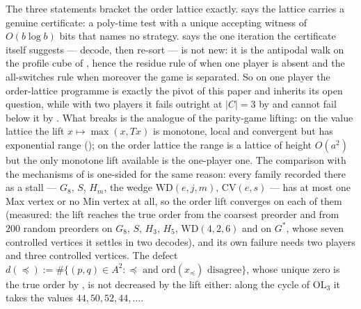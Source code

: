 \begin{remark}\label{ol:rem-where}
The three statements bracket the order lattice exactly.
 says the lattice carries a genuine certificate: a
poly-time test with a unique accepting witness of $O(b\log b)$ bits that
names no strategy.  says the one iteration the
certificate itself suggests --- decode, then re-sort --- is not new: it is
the antipodal walk on the profile cube of ,
hence the residue rule of  when one player is absent
and the all-switches rule when moreover the game is separated. So on one
player the order-lattice programme is exactly the pivot of this paper and
inherits its open question, while with two players it fails outright at
$|C|=3$ by  and cannot fail below it by
. What breaks is the analogue of the parity-game
lifting: on the value lattice the lift $x\mapsto\max(x,Tx)$ is monotone,
local and convergent but has exponential range
(); on the order lattice the range
is a lattice of height $O(a^{2})$ but the only monotone lift available is
the one-player one. The comparison with the mechanisms of 
is one-sided for the same reason: every family recorded there as a stall
--- $G_8$, $S$, $H_m$, the wedge $\mathrm{WD}(e,j,m)$, $\mathrm{CV}(e,s)$
--- has at most one Max vertex or no Min vertex at all, so the order lift
converges on each of them (measured: the lift reaches the true order from
the coarsest preorder and from $200$ random preorders on $G_8$, $S$,
$H_3$, $H_5$, $\mathrm{WD}(4,2,6)$ and on $G^{\ast}$, whose seven
controlled vertices it settles in two decodes), and its own failure needs
two players and three controlled vertices. The defect
$d(\preceq):=\#\{(p,q)\in A^2: \preceq \text{ and } \mathrm{ord}(x_\preceq)
\text{ disagree}\}$, whose unique zero is the true order by
, is not decreased by the lift either: along the cycle of
$\mathrm{OL}_3$ it takes the values $44,50,52,44,\dots$.
\end{remark}
